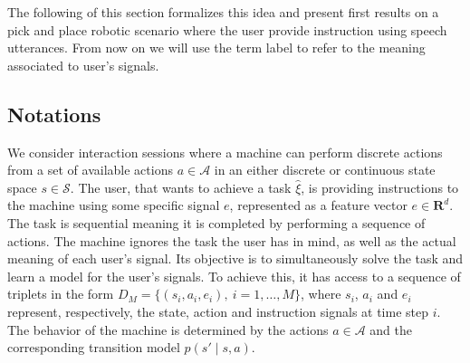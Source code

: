 
The following of this section formalizes this idea and present first results on a pick and place robotic scenario where the user provide instruction using speech utterances. From now on we will use the term label to refer to the meaning associated to user's signals.

\subsection{Notations}

We consider interaction sessions where a machine can perform discrete actions from a set of available actions $a \in \mathcal{A}$ in an either discrete or continuous state space $s \in \mathcal{S}$. The user, that wants to achieve a task $\hat{\xi}$, is providing instructions to the machine using some specific signal $e$, represented as a feature vector  $e \in \mathbf{R}^d$. The task is sequential meaning it is completed by performing a sequence of actions. The machine ignores the task the user has in mind, as well as the actual meaning of each user's signal. Its objective is to simultaneously solve the task and learn a model for the user's signals. To achieve this, it has access to a sequence of triplets in the form $D_M = \{(s_i, a_i, e_i),\ i = 1,\ldots,M\}$, where $s_i$, $a_i$ and $e_i$ represent, respectively, the state, action and instruction signals at time step $i$. The behavior of the machine is determined by the actions $a\in\mathcal{A}$ and the corresponding transition model $p(s'\mid s,a)$.

